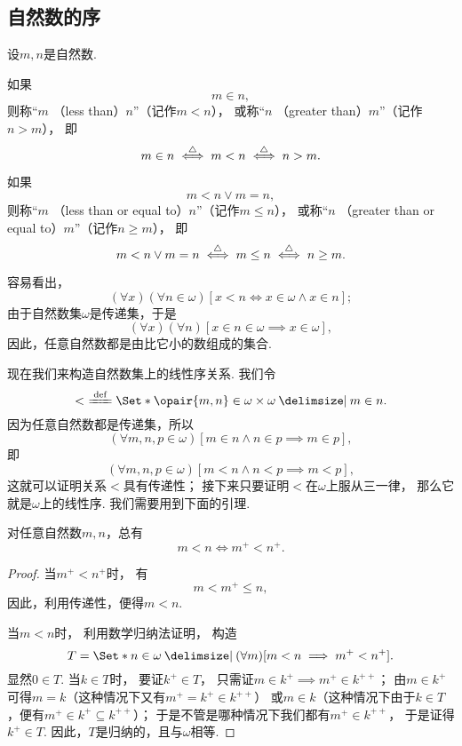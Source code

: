 \subsection{自然数的序}
\begin{definition}
设\(m,n\)是自然数.

如果\[
	m \in n,
\]
则称“\(m\) （less than）\(n\)”（记作\(m < n\)），
或称“\(n\) （greater than）\(m\)”（记作\(n > m\)），
即\[
	m \in n
	\overset{\triangle}{\iff} m < n
	\overset{\triangle}{\iff} n > m.
\]

如果\[
	m < n \lor m = n,
\]
则称“\(m\) （less than or equal to）\(n\)”（记作\(m \leq n\)），
或称“\(n\) （greater than or equal to）\(m\)”（记作\(n \geq m\)），
即\[
	m < n \lor m = n
	\overset{\triangle}{\iff} m \leq n
	\overset{\triangle}{\iff} n \geq m.
\]
\end{definition}

容易看出，\[
	(\forall x)(\forall n\in\omega)[
		x < n
		\iff
		x \in \omega \land x \in n
	];
\]
由于自然数集\(\omega\)是传递集，于是\[
	(\forall x)(\forall n)[x \in n \in \omega \implies x \in \omega],
\]
因此，任意自然数都是由比它小的数组成的集合.

现在我们来构造自然数集上的线性序关系.
我们令\[
	<\ \defeq \Set*{
		\opair{m,n} \in \omega \times \omega
		\given
		m \in n
	}.
\]
因为任意自然数都是传递集，所以\[
	(\forall m,n,p \in \omega)[
		m \in n \land n \in p
		\implies
		m \in p
	],
\]
即\[
	(\forall m,n,p \in \omega)[
		m < n \land n < p
		\implies
		m < p
	],
\]
这就可以证明关系\(<\)具有传递性；
接下来只要证明\(<\)在\(\omega\)上服从三一律，
那么它就是\(\omega\)上的线性序.
我们需要用到下面的引理.

\begin{lemma}\label{theorem:集合论.自然数的线性序.引理1}
对任意自然数\(m,n\)，总有\[
	m < n
	\iff
	m^+ < n^+.
\]
\begin{proof}
当\(m^+ < n^+\)时，
有\[
	m < m^+ \leq n,
\]
因此，利用传递性，便得\(m < n\).

当\(m < n\)时，
利用数学归纳法证明，
构造\[
	T = \Set*{
		n \in \omega
		\given
		(\forall m)[m < n \implies m^+ < n^+]
	}.
\]
显然\(0 \in T\).
当\(k \in T\)时，
要证\(k^+ \in T\)，
只需证\(m \in k^+ \implies m^+ \in k^{++}\)；
由\(m \in k^+\)可得\(m = k\)（这种情况下又有\(m^+ = k^+ \in k^{++}\)）
或\(m \in k\)（这种情况下由于\(k \in T\)，便有\(m^+ \in k^+ \subseteq k^{++}\)）；
于是不管是哪种情况下我们都有\(m^+ \in k^{++}\)，
于是证得\(k^+ \in T\).
因此，\(T\)是归纳的，且与\(\omega\)相等.
\end{proof}
\end{lemma}

